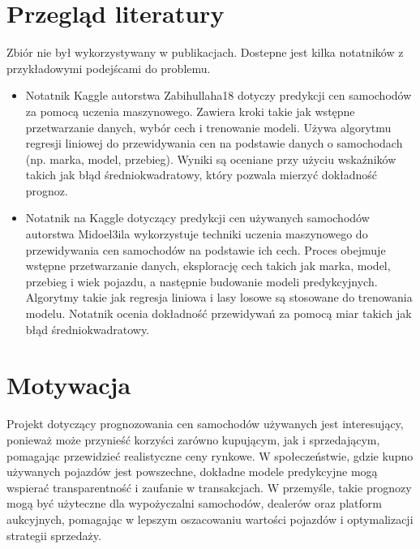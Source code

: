 \documentclass[10pt,letterpaper]{article}
\begin{document}
\section{Przegląd literatury}
Zbiór nie był wykorzystywany w publikacjach. Dostepne jest kilka notatników z przykładowymi podejścami do problemu. 
\begin{itemize}
	\item Notatnik Kaggle \cite{zabihullah18} autorstwa Zabihullaha18 dotyczy predykcji cen samochodów za pomocą uczenia maszynowego. Zawiera kroki takie jak wstępne przetwarzanie danych, wybór cech i trenowanie modeli. Używa algorytmu regresji liniowej do przewidywania cen na podstawie danych o samochodach (np. marka, model, przebieg). Wyniki są oceniane przy użyciu wskaźników takich jak błąd średniokwadratowy, który pozwala mierzyć dokładność prognoz.
	\item Notatnik na Kaggle \cite{midoel3ila2024} dotyczący predykcji cen używanych samochodów autorstwa Midoel3ila wykorzystuje techniki uczenia maszynowego do przewidywania cen samochodów na podstawie ich cech. Proces obejmuje wstępne przetwarzanie danych, eksplorację cech takich jak marka, model, przebieg i wiek pojazdu, a następnie budowanie modeli predykcyjnych. Algorytmy takie jak regresja liniowa i lasy losowe są stosowane do trenowania modelu. Notatnik ocenia dokładność przewidywań za pomocą miar takich jak błąd średniokwadratowy.
\end{itemize}

\section{Motywacja}
Projekt dotyczący prognozowania cen samochodów używanych jest interesujący, ponieważ może przynieść korzyści zarówno kupującym, jak i sprzedającym, pomagając przewidzieć realistyczne ceny rynkowe. W społeczeństwie, gdzie kupno używanych pojazdów jest powszechne, dokładne modele predykcyjne mogą wspierać transparentność i zaufanie w transakcjach. W przemyśle, takie prognozy mogą być użyteczne dla wypożyczalni samochodów, dealerów oraz platform aukcyjnych, pomagając w lepszym oszacowaniu wartości pojazdów i optymalizacji strategii sprzedaży.

\newpage
\end{document}
